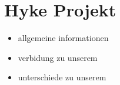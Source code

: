 \section{Hyke Projekt}


\begin{itemize}
	\item allgemeine informationen
	\item verbidung zu unserem
	\item unterschiede zu unserem
\end{itemize}


